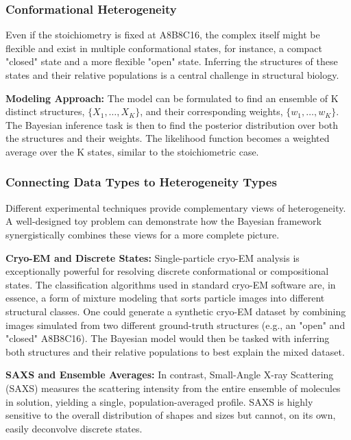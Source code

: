 \documentclass{article}
\begin{document}
\subsubsection{Conformational Heterogeneity}

Even if the stoichiometry is fixed at A8B8C16, the complex itself might be flexible and exist in multiple conformational states, for instance, a compact "closed" state and a more flexible "open" state. Inferring the structures of these states and their relative populations is a central challenge in structural biology.\cite{ref40}

\textbf{Modeling Approach:} The model can be formulated to find an ensemble of K distinct structures, $\{X_1, \dots, X_K\}$, and their corresponding weights, $\{w_1, \dots, w_K\}$. The Bayesian inference task is then to find the posterior distribution over both the structures and their weights.\cite{ref41} The likelihood function becomes a weighted average over the K states, similar to the stoichiometric case.

\subsubsection{Connecting Data Types to Heterogeneity Types}

Different experimental techniques provide complementary views of heterogeneity. A well-designed toy problem can demonstrate how the Bayesian framework synergistically combines these views for a more complete picture.

\textbf{Cryo-EM and Discrete States:} Single-particle cryo-EM analysis is exceptionally powerful for resolving discrete conformational or compositional states. The classification algorithms used in standard cryo-EM software are, in essence, a form of mixture modeling that sorts particle images into different structural classes.\cite{ref30} One could generate a synthetic cryo-EM dataset by combining images simulated from two different ground-truth structures (e.g., an "open" and "closed" A8B8C16). The Bayesian model would then be tasked with inferring both structures and their relative populations to best explain the mixed dataset.

\textbf{SAXS and Ensemble Averages:} In contrast, Small-Angle X-ray Scattering (SAXS) measures the scattering intensity from the entire ensemble of molecules in solution, yielding a single, population-averaged profile.\cite{ref40} SAXS is highly sensitive to the overall distribution of shapes and sizes but cannot, on its own, easily deconvolve discrete states.
\end{document}
